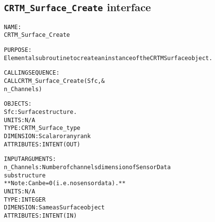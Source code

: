 \subsection{\texttt{CRTM\_Surface\_Create} interface}
  \label{sec:CRTM_Surface_Create_interface}
  \begin{alltt}
 
  NAME:
        CRTM_Surface_Create
  
  PURPOSE:
        Elemental subroutine to create an instance of the CRTM Surface object.
 
  CALLING SEQUENCE:
        CALL CRTM_Surface_Create( Sfc       , &
                                  n_Channels  )
 
  OBJECTS:
        Sfc:          Surface structure.
                      UNITS:      N/A
                      TYPE:       CRTM_Surface_type
                      DIMENSION:  Scalar or any rank
                      ATTRIBUTES: INTENT(OUT)
 
  INPUT ARGUMENTS:
        n_Channels:   Number of channels dimension of SensorData
                      substructure
                      ** Note: Can be = 0 (i.e. no sensor data). **
                      UNITS:      N/A
                      TYPE:       INTEGER
                      DIMENSION:  Same as Surface object
                      ATTRIBUTES: INTENT(IN)
 
  \end{alltt}
